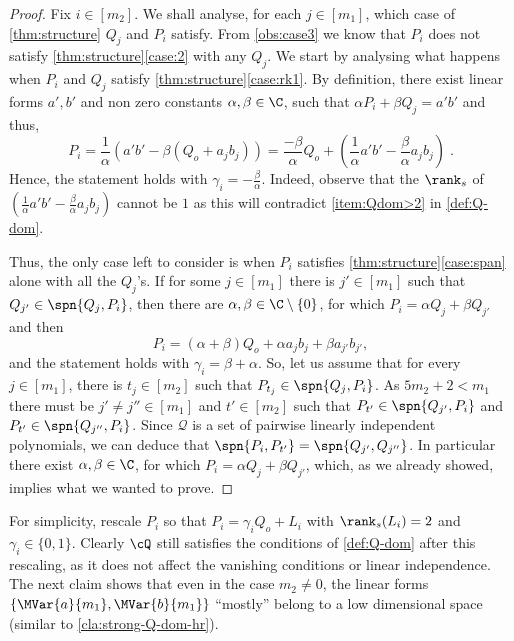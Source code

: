 \begin{proof}
Fix $i\in [m_2]$. We shall analyse, for each $j \in [m_1]$, which case of \autoref{thm:structure} $Q_j$ and $P_i$ satisfy.
From \autoref{obs:case3} we know that $P_i$ does not satisfy \autoref{thm:structure}\ref{case:2} with any $Q_j$.
We start by analysing what happens when $P_i$ and  $Q_j$ satisfy \autoref{thm:structure}\ref{case:rk1}.  By definition, there exist linear forms  $a', b'$ and non zero constants $\alpha, \beta \in \C$, such that $\alpha P_i + \beta Q_j = a'b'$  and thus, 
\begin{equation}
\label{eq:case2}
P_i = \frac{1}{\alpha}\left(a'b' - \beta \left(Q_o+a_j b_j\right)\right) = \frac{-\beta}{\alpha}Q_o + \left(\frac{1}{\alpha} a'b' - \frac{\beta}{\alpha} a_j b_j\right) \;.
\end{equation} 
Hence, the statement holds with $\gamma_i = - \frac{\beta}{\alpha}$. Indeed, observe that the $\rank_s$ of $(\frac{1}{\alpha} a'b' - \frac{\beta}{\alpha} a_j b_j)$ cannot be $1$ as this will contradict \autoref{item:Qdom>2}  in \autoref{def:Q-dom}.

Thus, the only case left to consider is when $P_i$ satisfies \autoref{thm:structure}\ref{case:span} alone with all the $Q_j$'s. If for some $j\in [m_1]$ there is $j'\in [m_1]$ such that $Q_{j'}\in \spn{Q_j,P_i}$, then there are $\alpha, \beta \in \C\setminus\{0\}$, for which $P_i =\alpha Q_j + \beta Q_{j'}$ and then 
\[
P_i = (\alpha + \beta)Q_o + \alpha a_j b_j + \beta a_{j'} b_{j'},
\] and the statement holds with $\gamma_i =  \beta+ \alpha$. 
So, let us assume that for every $j \in [m_1]$, there is $t_j \in [m_2]$ such that $P_{t_j} \in \spn{Q_j,P_i}$. As $5m_2+2<m_1$ there must be $j'\neq j'' \in [m_1]$ and $t'\in [m_2]$ such that $P_{t'} \in \spn{Q_{j'}, P_i}$ and $ P_{t'} \in \spn{Q_{j''}, P_i}$. Since $\mathcal{Q}$ is a set of pairwise linearly independent polynomials, we can deduce that $\spn{P_i, P_{t'}} = \spn{Q_{j'}, Q_{j''}}$. In particular there exist  $\alpha, \beta \in \C$, for which $P_i =\alpha Q_j + \beta Q_{j'}$, which, as we already showed, implies what we wanted to prove.
\end{proof}

For simplicity, rescale $P_i$ so that $P_i = \gamma_i Q_o+L_i$ with $\rank_s(L_i)=2$ and $\gamma_i \in \{0,1\}$. Clearly $\cQ$ still satisfies the conditions of \autoref{def:Q-dom} after this rescaling, as it does not affect the vanishing conditions or linear independence. The next claim shows that even in the case $m_2\neq 0$, the linear forms $\lbrace \MVar{a}{m_1}, \MVar{b}{m_1}\rbrace$ ``mostly'' belong to a low dimensional space (similar to \autoref{cla:strong-Q-dom-hr}). 

